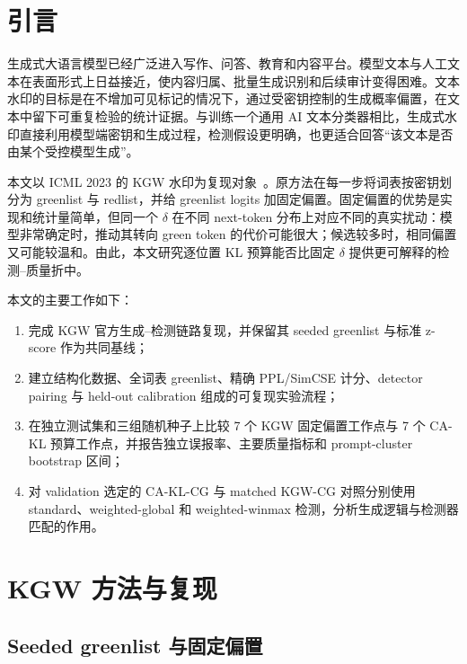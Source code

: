 \documentclass[a4paper,UTF8,zihao=5]{ctexart}
\newcommand{\cakl}{CA-KL}
\newcommand{\caklcg}{CA-KL-CG}
\begin{document}
\clearpage
{}
\tableofcontents
\clearpage
{}

\section{引言}

生成式大语言模型已经广泛进入写作、问答、教育和内容平台。模型文本与人工文本在表面形式上日益接近，使内容归属、批量生成识别和后续审计变得困难。文本水印的目标是在不增加可见标记的情况下，通过受密钥控制的生成概率偏置，在文本中留下可重复检验的统计证据。与训练一个通用 AI 文本分类器相比，生成式水印直接利用模型端密钥和生成过程，检测假设更明确，也更适合回答“该文本是否由某个受控模型生成”。

本文以 ICML 2023 的 KGW 水印为复现对象~\cite{kirchenbauer2023watermark}。原方法在每一步将词表按密钥划分为 greenlist 与 redlist，并给 greenlist logits 加固定偏置。固定偏置的优势是实现和统计量简单，但同一个 $\delta$ 在不同 next-token 分布上对应不同的真实扰动：模型非常确定时，推动其转向 green token 的代价可能很大；候选较多时，相同偏置又可能较温和。由此，本文研究逐位置 KL 预算能否比固定 $\delta$ 提供更可解释的检测--质量折中。

本文的主要工作如下：

\begin{enumerate}
    \item 完成 KGW 官方生成--检测链路复现，并保留其 seeded greenlist 与标准 z-score 作为共同基线；
    \item 建立结构化数据、全词表 greenlist、精确 PPL/SimCSE 计分、detector pairing 与 held-out calibration 组成的可复现实验流程；
    \item 在独立测试集和三组随机种子上比较 7 个 KGW 固定偏置工作点与 7 个 \cakl{} 预算工作点，并报告独立误报率、主要质量指标和 prompt-cluster bootstrap 区间；
    \item 对 validation 选定的 \caklcg{} 与 matched KGW-CG 对照分别使用 standard、weighted-global 和 weighted-winmax 检测，分析生成逻辑与检测器匹配的作用。
\end{enumerate}

\section{KGW 方法与复现}

\subsection{Seeded greenlist 与固定偏置}
\end{document}
